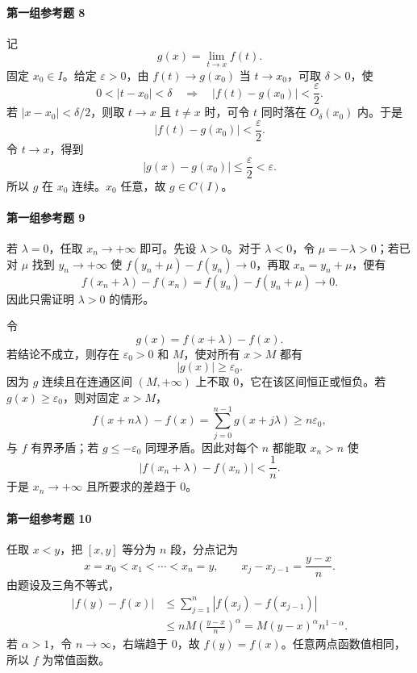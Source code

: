 \paragraph{第一组参考题 8}
\begin{xsolution}
记
\[
 g(x)=\lim_{t\to x}f(t).
\]
固定 $x_0\in I$。给定 $\varepsilon>0$，由 $f(t)\to g(x_0)$ 当 $t\to x_0$，可取 $\delta>0$，使
\[
 0<|t-x_0|<\delta
 \quad\Longrightarrow\quad
 |f(t)-g(x_0)|<\frac\varepsilon2.
\]
若 $|x-x_0|<\delta/2$，则取 $t\to x$ 且 $t\ne x$ 时，可令 $t$ 同时落在 $O_\delta(x_0)$ 内。于是
\[
 |f(t)-g(x_0)|<\frac\varepsilon2.
\]
令 $t\to x$，得到
\[
 |g(x)-g(x_0)|\le\frac\varepsilon2<\varepsilon.
\]
所以 $g$ 在 $x_0$ 连续。$x_0$ 任意，故 $g\in C(I)$。
\end{xsolution}

\paragraph{第一组参考题 9}
\begin{xsolution}
若 $\lambda=0$，任取 $x_n\to+\infty$ 即可。先设 $\lambda>0$。对于 $\lambda<0$，令 $\mu=-\lambda>0$；若已对 $\mu$ 找到 $y_n\to+\infty$ 使 $f(y_n+\mu)-f(y_n)\to0$，再取 $x_n=y_n+\mu$，便有
\[
 f(x_n+\lambda)-f(x_n)=f(y_n)-f(y_n+\mu)\to0.
\]
因此只需证明 $\lambda>0$ 的情形。

令
\[
 g(x)=f(x+\lambda)-f(x).
\]
若结论不成立，则存在 $\varepsilon_0>0$ 和 $M$，使对所有 $x>M$ 都有
\[
 |g(x)|\ge\varepsilon_0.
\]
因为 $g$ 连续且在连通区间 $(M,+\infty)$ 上不取 $0$，它在该区间恒正或恒负。若 $g(x)\ge\varepsilon_0$，则对固定 $x>M$，
\[
 f(x+n\lambda)-f(x)
 =\sum_{j=0}^{n-1}g(x+j\lambda)
 \ge n\varepsilon_0,
\]
与 $f$ 有界矛盾；若 $g\le-\varepsilon_0$ 同理矛盾。因此对每个 $n$ 都能取 $x_n>n$ 使
\[
 |f(x_n+\lambda)-f(x_n)|<\frac1n.
\]
于是 $x_n\to+\infty$ 且所要求的差趋于 $0$。
\end{xsolution}

\paragraph{第一组参考题 10}
\begin{xsolution}
任取 $x<y$，把 $[x,y]$ 等分为 $n$ 段，分点记为
\[
 x=x_0<x_1<\cdots<x_n=y,
 \qquad x_j-x_{j-1}=\frac{y-x}{n}.
\]
由题设及三角不等式，
\[
 \begin{aligned}
 |f(y)-f(x)|
 &\le\sum_{j=1}^n|f(x_j)-f(x_{j-1})|\\
 &\le nM\left(\frac{y-x}{n}\right)^\alpha
 =M(y-x)^\alpha n^{1-\alpha}.
 \end{aligned}
\]
若 $\alpha>1$，令 $n\to\infty$，右端趋于 $0$，故 $f(y)=f(x)$。任意两点函数值相同，所以 $f$ 为常值函数。
\end{xsolution}

